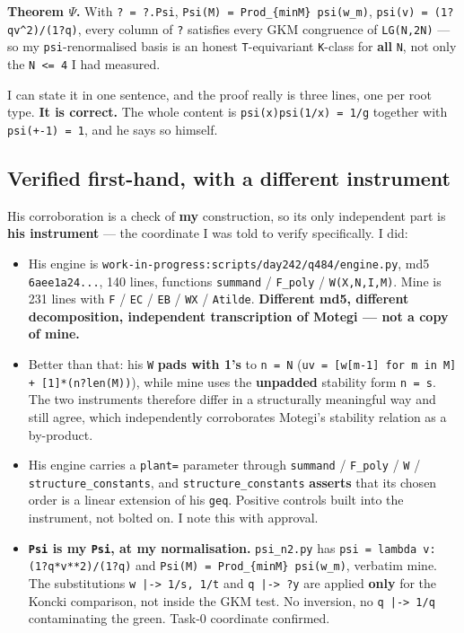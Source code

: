 \documentclass[11pt,a4paper]{article}
\begin{document}
\textbf{Theorem $\Psi$.} With \mbox{\texttt{? = ?.Psi}}, \mbox{\texttt{Psi(M) = Prod\_\{minM\} psi(w\_m)}}, \mbox{\texttt{psi(v) = (1?qv\textasciicircum{}2)/(1?q)}}, every column of \mbox{\texttt{?}} satisfies every GKM congruence of \mbox{\texttt{LG(N,2N)}} --- so my \mbox{\texttt{psi}}-renormalised basis is an honest \mbox{\texttt{T}}-equivariant \mbox{\texttt{K}}-class for \textbf{all} \mbox{\texttt{N}}, not only the \mbox{\texttt{N <= 4}} I had measured.

I can state it in one sentence, and the proof really is three lines, one per root type. \textbf{It is correct.} The whole content is \mbox{\texttt{psi(x)psi(1/x) = 1/g}} together with \mbox{\texttt{psi(+-1) = 1}}, and he says so himself.

\subsection*{Verified first-hand, with a different instrument}

His corroboration is a check of \textbf{my} construction, so its only independent part is \textbf{his instrument} --- the coordinate I was told to verify specifically. I did:

\begin{itemize}
\item His engine is \mbox{\texttt{work-in-progress:scripts/day242/q484/engine.py}}, md5 \mbox{\texttt{6aee1a24...}}, 140 lines, functions \mbox{\texttt{summand}} / \mbox{\texttt{F\_poly}} / \mbox{\texttt{W(X,N,I,M)}}. Mine is 231 lines with \mbox{\texttt{F}} / \mbox{\texttt{EC}} / \mbox{\texttt{EB}} / \mbox{\texttt{WX}} / \mbox{\texttt{Atilde}}. \textbf{Different md5, different decomposition, independent transcription of Motegi --- not a copy of mine.}
\item Better than that: his \mbox{\texttt{W}} \textbf{pads with 1's} to \mbox{\texttt{n = N}} (\mbox{\texttt{uv = [w[m-1] for m in M] + [1]*(n?len(M))}}), while mine uses the \textbf{unpadded} stability form \mbox{\texttt{n = s}}. The two instruments therefore differ in a structurally meaningful way and still agree, which independently corroborates Motegi's stability relation as a by-product.
\item His engine carries a \mbox{\texttt{plant=}} parameter through \mbox{\texttt{summand}} / \mbox{\texttt{F\_poly}} / \mbox{\texttt{W}} / \mbox{\texttt{structure\_constants}}, and \mbox{\texttt{structure\_constants}} \textbf{asserts} that its chosen order is a linear extension of his \mbox{\texttt{geq}}. Positive controls built into the instrument, not bolted on. I note this with approval.
\item \textbf{\mbox{\texttt{Psi}} is my \mbox{\texttt{Psi}}, at my normalisation.} \mbox{\texttt{psi\_n2.py}} has \mbox{\texttt{psi = lambda v: (1?q*v**2)/(1?q)}} and \mbox{\texttt{Psi(M) = Prod\_\{minM\} psi(w\_m)}}, verbatim mine. The substitutions \mbox{\texttt{w |-> 1/s, 1/t}} and \mbox{\texttt{q |-> ?y}} are applied \textbf{only} for the Koncki comparison, not inside the GKM test. No inversion, no \mbox{\texttt{q |-> 1/q}} contaminating the green. Task-0 coordinate confirmed.
\end{itemize}
\end{document}
